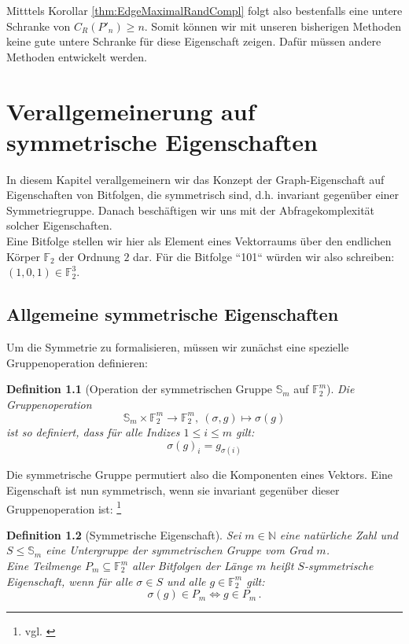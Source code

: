 \documentclass[10pt,a4paper, footheight=1mm]{scrreprt}
\newtheorem{definition}{Definition}
\theoremstyle{definition}
\begin{document}
Mitttels Korollar \ref{thm:EdgeMaximalRandCompl} folgt also bestenfalls
eine untere Schranke von $C_R(P'_n) \geq n$. Somit können
wir mit unseren bisherigen Methoden keine gute untere Schranke
für diese Eigenschaft zeigen. Dafür müssen andere Methoden
entwickelt werden.

\chapter{Verallgemeinerung auf symmetrische Eigenschaften}
In diesem Kapitel verallgemeinern wir das Konzept der
Graph-Eigenschaft auf Eigenschaften von Bitfolgen, die
symmetrisch sind, d.h. invariant gegenüber einer Symmetriegruppe.
Danach beschäftigen wir uns mit der Abfragekomplexität
solcher Eigenschaften. \\
Eine Bitfolge stellen wir hier als Element eines Vektorraums
über den endlichen Körper $\mathbb{F}_2$ der Ordnung $2$ dar.
Für die Bitfolge ``101`` würden wir also schreiben:
$ (1,0,1) \in \mathbb{F}_2^3$.

\section{Allgemeine symmetrische Eigenschaften}
Um die Symmetrie zu formalisieren, müssen wir zunächst
eine spezielle Gruppenoperation definieren:

\begin{definition}
[Operation der symmetrischen Gruppe $\mathbb{S}_m$ auf $\mathbb{F}_2^m$]
Die Gruppenoperation
$$\mathbb{S}_m \times \mathbb{F}_2^m \to \mathbb{F}_2^m, 
  \ (\sigma,g) \mapsto \sigma(g)$$
ist so definiert, dass für alle Indizes $1\leq i \leq m$ gilt:
$$ \sigma(g)_i = g_{\sigma(i)} $$
\end{definition}
Die symmetrische Gruppe permutiert also die Komponenten eines
Vektors. Eine Eigenschaft ist nun symmetrisch, wenn sie invariant
gegenüber dieser Gruppenoperation ist:
\footnote{vgl. \cite[S.7]{Rivest}}

\begin{definition}[Symmetrische Eigenschaft]
Sei $m\in \mathbb{N}$ eine natürliche Zahl und
$S \leq \mathbb{S}_m$ eine Untergruppe der 
symmetrischen Gruppe vom Grad $m$. \\
Eine Teilmenge
$P_m \subseteq \mathbb{F}_2^m$ aller Bitfolgen der
Länge $m$ heißt \emph{$S$-symmetrische Eigenschaft}, wenn
für alle $\sigma \in S$ und alle $g\in \mathbb{F}_2^m$ gilt:
$$ \sigma(g)\in P_m \iff g \in P_m\,.$$ 
\end{definition}
\end{document}

